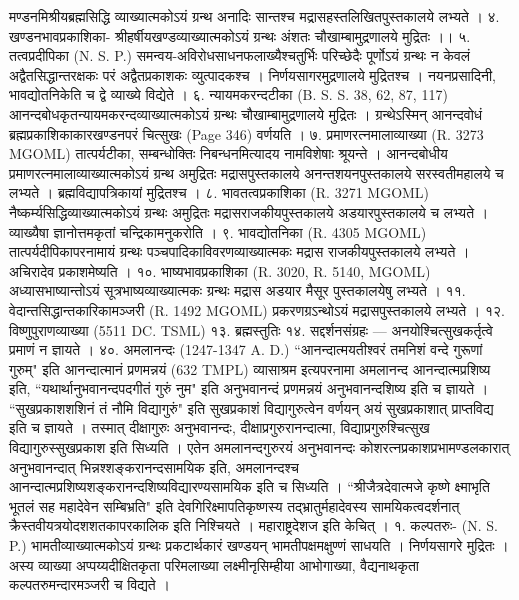 मण्डनमिश्रीयब्रह्मसिद्धि व्याख्यात्मकोऽयं ग्रन्थ अनादिः सान्तश्च मद्रासहस्तलिखितपुस्तकालये लभ्यते ।
४. खण्डनभावप्रकाशिका-
श्रीहर्षीयखण्डव्याख्यात्मकोऽयं ग्रन्थः अंशतः चौखाम्बामुद्रणालये मुद्रितः ।।
५. तत्वप्रदीपिका (N. S. P.)
समन्वय-अविरोधसाधनफलाख्यैश्चतुर्भिः परिच्छेदैः पूर्णोऽयं ग्रन्थः न केवलं अद्वैतसिद्धान्तरक्षकः परं अद्वैतप्रकाशकः व्युत्पादकश्च । निर्णयसागरमुद्रणालये मुद्रितश्च । नयनप्रसादिनी, भावद्योतनिकेति च द्वे व्याख्ये विद्येते ।
६. न्यायमकरन्दटीका (B. S. S. 38, 62, 87, 117)
आनन्दबोधकृतन्यायमकरन्दव्याख्यात्मकोऽयं ग्रन्थः चौखाम्बामुद्रणालये मुद्रितः । ग्रन्थेऽस्मिन् आनन्दवोधं ब्रह्मप्रकाशिकाकारखण्डनपरं चित्सुखः (Page 346) वर्णयति ।
७. प्रमाणरत्नमालाव्याख्या (R. 3273 MGOML)
तात्पर्यटीका, सम्बन्धोक्तिः निबन्धनमित्यादय नामविशेषाः श्रूयन्ते । आनन्दबोधीय प्रमाणरत्नमालाव्याख्यात्मकोऽयं ग्रन्थ अमुद्रितः मद्रासपुस्तकालये अनन्तशयनपुस्तकालये सरस्वतीमहालये च लभ्यते । ब्रह्मविद्यापत्रिकायां मुद्रितश्च ।
८. भावतत्वप्रकाशिका (R. 3271 MGOML)
नैष्कर्म्यसिद्धिव्याख्यात्मकोऽयं ग्रन्थः अमुद्रितः मद्रासराजकीयपुस्तकालये अडयारपुस्तकालये च लभ्यते । व्याख्यैषा ज्ञानोत्तमकृतां चन्द्रिकामनुकरोति ।
९. भावद्योतनिका (R. 4305 MGOML)
तात्पर्यदीपिकापरनामायं ग्रन्थः पञ्चपादिकाविवरणव्याख्यात्मकः मद्रास राजकीयपुस्तकालये लभ्यते । अचिरादेव प्रकाशमेष्यति ।
१०. भाष्यभावप्रकाशिका (R. 3020, R. 5140, MGOML)
अध्यासभाष्यान्तोऽयं सूत्रभाष्यव्याख्यात्मकः ग्रन्थः मद्रास अडयार मैसूर पुस्तकालयेषु लभ्यते ।
११. वेदान्तसिद्धान्तकारिकामञ्जरी (R. 1492 MGOML) प्रकरणग्रऽन्थोऽयं मद्रासपुस्तकालये लभ्यते ।
१२. विष्णुपुराणव्याख्या (5511 DC. TSML)
१३. ब्रह्मस्तुतिः
१४. सद्दर्शनसंग्रहः --- अनयोश्चित्सुखकर्तृत्वे प्रमाणं न ज्ञायते ।
४०. अमलानन्दः (1247-1347 A. D.)
``आनन्दात्मयतीश्वरं तमनिशं वन्दे गुरूणां गुरुम्" इति आनन्दात्मानं प्रणमन्नयं (632 TMPL) व्यासाश्रम इत्यपरनामा अमलानन्द आनन्दात्मप्रशिष्य इति, ``यथार्थानुभवानन्दपदगीतं गुरुं नुम" इति अनुभवानन्दं प्रणमन्नयं अनुभवानन्दशिष्य इति च ज्ञायते । ``सुखप्रकाशशशिनं तं नौमि विद्यागुरुं" इति सुखप्रकाशं विद्यागुरुत्वेन वर्णयन् अयं सुखप्रकाशात् प्राप्तविद्य इति च ज्ञायते । तस्मात् दीक्षागुरुः अनुभवानन्दः, दीक्षाप्रगुरुरानन्दात्मा, विद्याप्रगुरुश्चित्सुख विद्यागुरुस्सुखप्रकाश इति सिध्यति । एतेन अमलानन्दगुरुरयं अनुभवानन्दः कोशरत्नप्रकाशप्रभामण्डलकारात् अनुभवानन्दात् भिन्नश्शङ्करानन्दसामयिक इति, अमलानन्दश्च आनन्दात्मप्रशिष्यशङ्करानन्दशिष्यविद्यारण्यसामयिक इति च सिध्यति ।
``श्रीजैत्रदेवात्मजे कृष्णे क्ष्माभृति भूतलं सह महादेवेन सम्बिभ्रति" इति देवगिरिक्ष्मापतिकृष्णस्य तद्भ्रातुर्महादेवस्य सामयिकत्वदर्शनात् क्रैस्तवीयत्रयोदशशतकापरकालिक इति निश्चियते । महाराष्ट्रदेशज इति केचित् ।
१. कल्पतरुः- (N. S. P.)
भामतीव्याख्यात्मकोऽयं ग्रन्थः प्रकटार्थकारं खण्डयन् भामतीपक्षमक्षुण्णं साधयति । निर्णयसागरे मुद्रितः । अस्य व्याख्या अप्पय्यदीक्षितकृता परिमलाख्या लक्ष्मीनृसिम्हीया आभोगाख्या, वैद्यनाथकृता कल्पतरुमन्दारमञ्जरी च विद्यते ।
